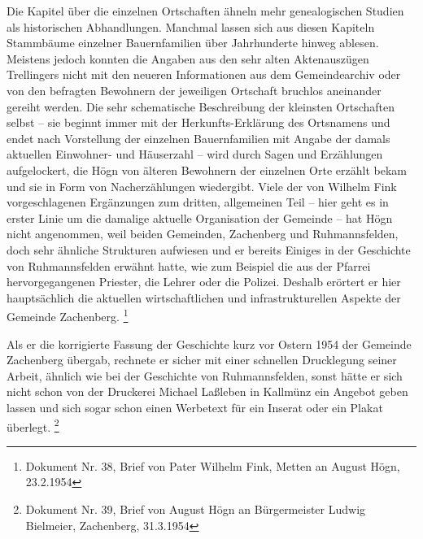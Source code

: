 Die Kapitel über die einzelnen Ortschaften ähneln mehr genealogischen
Studien als historischen Abhandlungen. Manchmal lassen sich aus diesen
Kapiteln Stammbäume einzelner Bauernfamilien über Jahrhunderte hinweg
ablesen. Meistens jedoch konnten die Angaben aus den sehr alten
Aktenauszügen Trellingers nicht mit den neueren Informationen aus dem
Gemeindearchiv oder von den befragten Bewohnern der jeweiligen
Ortschaft bruchlos aneinander gereiht werden. Die sehr schematische
Beschreibung der kleinsten Ortschaften selbst – sie beginnt immer mit
der Herkunfts-Erklärung des Ortsnamens und endet nach Vorstellung der
einzelnen Bauernfamilien mit Angabe der damals aktuellen Einwohner- und
Häuserzahl – wird durch Sagen und Erzählungen aufgelockert, die Högn
von älteren Bewohnern der einzelnen Orte erzählt bekam und sie in Form
von Nacherzählungen wiedergibt. Viele der von Wilhelm Fink
vorgeschlagenen Ergänzungen zum dritten, allgemeinen Teil – hier geht
es in erster Linie um die damalige aktuelle Organisation der Gemeinde –
hat Högn nicht angenommen, weil beiden Gemeinden, Zachenberg und
Ruhmannsfelden, doch sehr ähnliche Strukturen aufwiesen und er bereits
Einiges in der Geschichte von Ruhmannsfelden erwähnt hatte, wie zum
Beispiel die aus der Pfarrei hervorgegangenen Priester, die Lehrer oder
die Polizei. Deshalb erörtert er hier hauptsächlich die aktuellen
wirtschaftlichen und infrastrukturellen Aspekte der Gemeinde
Zachenberg. \footnote{Dokument Nr. 38, Brief von Pater Wilhelm Fink,
Metten an August Högn, 23.2.1954}

Als er die korrigierte Fassung der Geschichte kurz vor Ostern 1954 der
Gemeinde Zachenberg übergab, rechnete er sicher mit einer schnellen
Drucklegung seiner Arbeit, ähnlich wie bei der Geschichte von
Ruhmannsfelden, sonst hätte er sich nicht schon von der Druckerei
Michael Laßleben in Kallmünz ein Angebot geben lassen und sich sogar
schon einen Werbetext für ein Inserat oder ein Plakat
überlegt. \footnote{Dokument Nr. 39, Brief von August Högn an
Bürgermeister Ludwig Bielmeier, Zachenberg, 31.3.1954}

